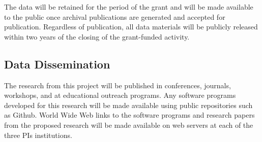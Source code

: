 \documentclass[11pt]{article}
\begin{document}
    The data will be retained for the period of the grant and will be made available to the public once archival publications are generated and accepted for publication.  Regardless of publication, all data materials will be publicly released within two years of the closing of the grant-funded activity.
    
    \subsection*{Data Dissemination}
    The research from this project will be published in conferences, journals, workshops, and at educational outreach programs. 
    Any software programs developed for this research will be made available using public repositories such as Github.
    World Wide Web links to the software programs and research papers from the proposed research will be made available on web servers at each of the three PIs institutions. 
    
\end{document}
